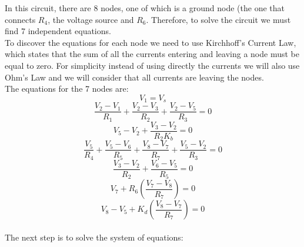 In this circuit, there are 8 nodes, one of which is a ground node (the one that connects $R_4$, the voltage source and $R_6$. Therefore, to solve the circuit we must find 7 independent equations. \\
To discover the equations for each node we need to use Kirchhoff’s Current Law, which states that the sum of all the currents entering and leaving a node must be equal to zero. For simplicity instead of using directly the currents we will also use Ohm's Law and we will consider that all currents are leaving the nodes. \\
The equations for the 7 nodes are:
\begin{equation}
    V_{1}=V_{s} 
\end{equation}
\begin{equation}
  \frac{V_{2}-V_{1}}{R_{1}} +\frac{V_{2}-V_{3}}{R_{2}}+\frac{V_{2}-V_{5}}{R_{3}}=0 
\end{equation}
\begin{equation}
  V_{5}-V_{2}+\frac{V_{3}-V_{2}}{R_{2} K_b}=0
\end{equation}
\begin{equation}
   \frac{V_{5}}{R_{4}} + \frac{V_{5}-V_{6}}{R_{5}}+ \frac{V_{8}-V_{7}}{R_{7}} + \frac{V_{5}-V_{2}}{R_{3}}=0 
\end{equation}
\begin{equation}
    \frac{V_{3}- V_{2}}{R_{2}} + \frac{V_{6}-V_{5}}{R_{5}} = 0
\end{equation}
\begin{equation}
    V_{7}+ R_6 \left(\frac{V_{7}-V_{8}}{R_{7}}\right) = 0
\end{equation}
\begin{equation}
  V_{8}-V_{5} + K_d \left(\frac{V_{8}-V_{7}}{R_{7}}\right) = 0
\end{equation}
\\
The next step is to solve the system of equations: \\
\\

